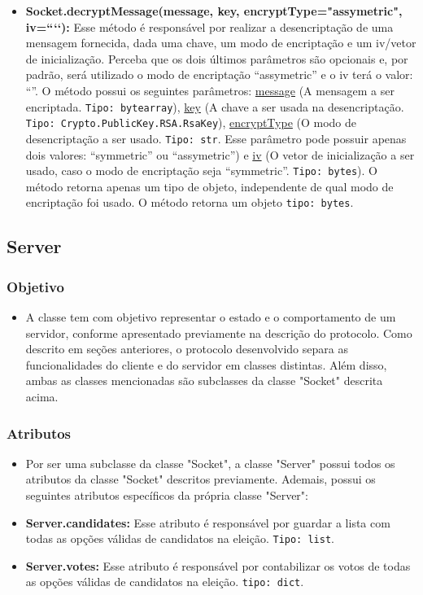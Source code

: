 \documentclass[10pt]{article}
\begin{document}
\begin{itemize}
\begin{itemize}
            \item \textbf{Socket.decryptMessage(message, key, encryptType="assymetric", iv=“‘‘):} Esse método é responsável por realizar a desencriptação de uma mensagem fornecida, dada uma chave, um modo de encriptação e um iv/vetor de inicialização. Perceba que os dois últimos parâmetros são opcionais e, por padrão, será utilizado o modo de encriptação “assymetric” e o iv terá o valor: “”. O método possui os seguintes parâmetros: \underline{message} (A mensagem a ser encriptada. \texttt{Tipo: bytearray}), \underline{key} (A chave a ser usada na desencriptação. \texttt{Tipo: Crypto.PublicKey.RSA.RsaKey}), \underline{encryptType} (O modo de desencriptação a ser usado. \texttt{Tipo: str}. Esse parâmetro pode possuir apenas dois valores: “symmetric” ou “assymetric”) e \underline{iv} (O vetor de inicialização a ser usado, caso o modo de encriptação seja “symmetric”. \texttt{Tipo: bytes}). O método retorna apenas um tipo de objeto, independente de qual modo de encriptação foi usado. O método retorna um objeto \texttt{tipo: bytes}.
            
            \end{itemize}
        
    \subsection{\Large Server}
        \subsubsection{\large Objetivo}
            \begin{itemize}
            \item A classe tem com objetivo representar o estado e o comportamento de um servidor, conforme apresentado previamente na descrição do protocolo. Como descrito em seções anteriores, o protocolo desenvolvido separa as funcionalidades do cliente e do servidor em classes distintas. Além disso, ambas as classes mencionadas são subclasses da classe "Socket" descrita acima.
            \end{itemize}
        \subsubsection{\large Atributos}
            \begin{itemize}
            \item Por ser uma subclasse da classe "Socket", a classe "Server"  possui todos os atributos da classe "Socket" descritos previamente. Ademais, possui os seguintes atributos específicos da própria classe "Server":
            \item \textbf{Server.candidates:}  Esse atributo é responsável por guardar a lista com todas as opções válidas de candidatos na eleição. \texttt{Tipo: list}.
            \item \textbf{Server.votes:} Esse atributo é responsável por contabilizar os votos de todas as opções válidas de candidatos na eleição. \texttt{tipo: dict}.
            \end{itemize}

\end{itemize}
\end{document}
